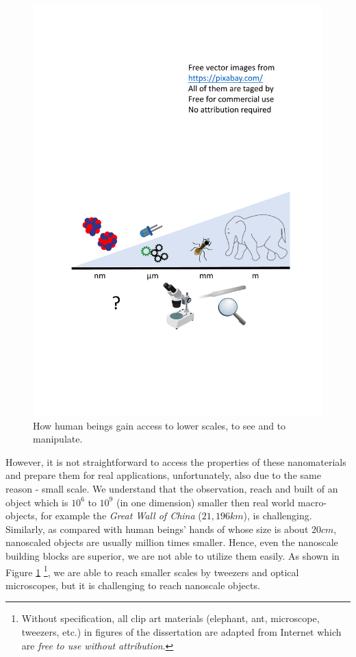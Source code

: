 \begin{figure} 
\centering
\includegraphics[width=350pt]{figures/figure1_scale_problem.pdf}
\caption[Scale problem]{How human beings gain access to lower scales, to see and to manipulate.\footnotemark[1]
\label{fig:1_scale}}
\end{figure}

However, it is not straightforward to access the properties of these nanomaterials and prepare them for real applications, unfortunately, also due to the same reason - small scale. We understand that the observation, reach and built of an object which is $10^6$ to $10^9$ (in one dimension) smaller then real world macro-objects, for example the {\em Great Wall of China} ($21,196 km$), is challenging. Similarly, as compared with human beings' hands of whose size is about $20 cm$, nanoscaled objects are usually million times smaller. Hence, even the nanoscale building blocks are superior, we are not able to utilize them easily. As shown in Figure \ref{fig:1_scale} \footnote{Without specification, all clip art materials (elephant, ant, microscope, tweezers, etc.) in figures of the dissertation are adapted from Internet which are {\em free to use without attribution}.}, we are able to reach smaller scales by tweezers and optical microscopes, but it is challenging to reach nanoscale objects. 

